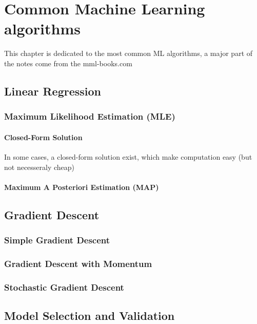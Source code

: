 \chapter{Common Machine Learning algorithms}\label{ch:introduction}

This chapter is dedicated to the most common ML algorithms, a major part of the notes come from the mml-books.com 

\section{Linear Regression}
	\subsection{Maximum Likelihood Estimation (MLE)}

		\subsubsection*{Closed-Form Solution}

			In some cases, a closed-form solution exist, which make computation easy (but not necesseraly cheap)
	\subsubsection{Maximum A Posteriori Estimation (MAP)}

\section{Gradient Descent}

	\subsection{Simple Gradient Descent}

	\subsection{Gradient Descent with Momentum}

	\subsection{Stochastic Gradient Descent}


\section{Model Selection and Validation}

